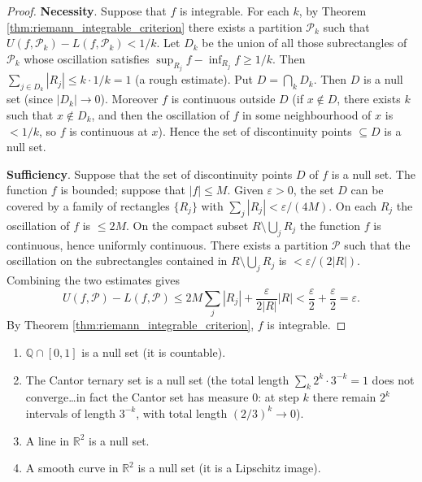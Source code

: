 \begin{proof}
\textbf{Necessity}. Suppose that $f$ is integrable. For each $k$, by Theorem \ref{thm:riemann_integrable_criterion} there exists a partition $\mathcal{P}_k$ such that $U(f, \mathcal{P}_k) - L(f, \mathcal{P}_k) < 1/k$. Let $D_k$ be the union of all those subrectangles of $\mathcal{P}_k$ whose oscillation satisfies $\sup_{R_j} f - \inf_{R_j} f \ge 1/k$. Then $\sum_{j \in D_k} |R_j| \le k \cdot 1/k = 1$ (a rough estimate). Put $D = \bigcap_k D_k$. Then $D$ is a null set (since $|D_k| \to 0$). Moreover $f$ is continuous outside $D$ (if $x \notin D$, there exists $k$ such that $x \notin D_k$, and then the oscillation of $f$ in some neighbourhood of $x$ is $< 1/k$, so $f$ is continuous at $x$). Hence the set of discontinuity points $\subseteq D$ is a null set.

\textbf{Sufficiency}. Suppose that the set of discontinuity points $D$ of $f$ is a null set. The function $f$ is bounded; suppose that $|f| \le M$. Given $\varepsilon > 0$, the set $D$ can be covered by a family of rectangles $\{R_j\}$ with $\sum_j |R_j| < \varepsilon / (4M)$. On each $R_j$ the oscillation of $f$ is $\le 2M$. On the compact subset $R \setminus \bigcup_j R_j$ the function $f$ is continuous, hence uniformly continuous. There exists a partition $\mathcal{P}$ such that the oscillation on the subrectangles contained in $R \setminus \bigcup_j R_j$ is $< \varepsilon / (2|R|)$. Combining the two estimates gives
\[
U(f, \mathcal{P}) - L(f, \mathcal{P}) \le 2M \sum_j |R_j| + \frac{\varepsilon}{2|R|} |R| < \frac{\varepsilon}{2} + \frac{\varepsilon}{2} = \varepsilon.
\]
By Theorem \ref{thm:riemann_integrable_criterion}, $f$ is integrable.
\end{proof}

\begin{example}\label{ex:null_set_examples}
\begin{enumerate}[label=(\roman*)]
    \item $\mathbb{Q} \cap [0, 1]$ is a null set (it is countable).
    \item The Cantor ternary set is a null set (the total length $\sum_k 2^k \cdot 3^{-k} = 1$ does not converge\dots in fact the Cantor set has measure $0$: at step $k$ there remain $2^k$ intervals of length $3^{-k}$, with total length $(2/3)^k \to 0$).
    \item A line in $\mathbb{R}^2$ is a null set.
    \item A smooth curve in $\mathbb{R}^2$ is a null set (it is a Lipschitz image).
\end{enumerate}
\end{example}

